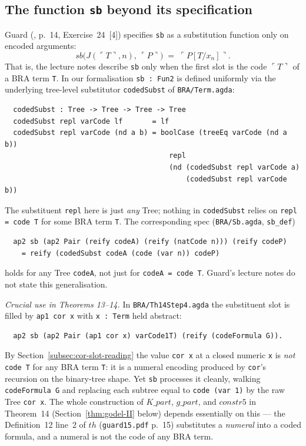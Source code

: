\documentclass[11pt]{article}
\begin{document}
\subsection{The function \texttt{sb} beyond its specification}
\label{subsec:sb-nonstandard}

Guard (\cite{guard1963}, p.~14, Exercise~24~[4]) specifies
\verb|sb| as a substitution function only on encoded arguments:
\[
  \mathit{sb}\big(J(\ulcorner T\urcorner, n),\, \ulcorner P\urcorner\big)
    \;=\; \ulcorner P[T/x_n]\urcorner.
\]
That is, the lecture notes describe \verb|sb| only when the first slot
is the code $\ulcorner T\urcorner$ of a BRA term \verb|T|.  In our
formalisation \verb|sb : Fun2| is defined uniformly via the underlying
tree-level substitutor \verb|codedSubst| of \verb|BRA/Term.agda|:
\begin{verbatim}
  codedSubst : Tree -> Tree -> Tree -> Tree
  codedSubst repl varCode lf       = lf
  codedSubst repl varCode (nd a b) = boolCase (treeEq varCode (nd a b))
                                       repl
                                       (nd (codedSubst repl varCode a)
                                           (codedSubst repl varCode b))
\end{verbatim}
The substituent \verb|repl| here is just \emph{any} Tree; nothing in
\verb|codedSubst| relies on \verb|repl = code T| for some BRA term
\verb|T|.  The corresponding spec (\verb|BRA/Sb.agda|, \verb|sb_def|)
\begin{verbatim}
  ap2 sb (ap2 Pair (reify codeA) (reify (natCode n))) (reify codeP)
    = reify (codedSubst codeA (code (var n)) codeP)
\end{verbatim}
holds for any Tree \verb|codeA|, not just for \verb|codeA = code T|.
Guard's lecture notes do not state this generalisation.

\emph{Crucial use in Theorems 13--14.}  In \verb|BRA/Th14Step4.agda|
the substituent slot is filled by \verb|ap1 cor x| with
\verb|x : Term| held abstract:
\begin{verbatim}
  ap2 sb (ap2 Pair (ap1 cor x) varCode1T) (reify (codeFormula G)).
\end{verbatim}
By Section~\ref{subsec:cor-slot-reading} the value \verb|cor x| at a
closed numeric \verb|x| is \emph{not} \verb|code T| for any BRA term
\verb|T|: it is a numeral encoding produced by \verb|cor|'s recursion
on the binary-tree shape.  Yet \verb|sb| processes it cleanly,
walking \verb|codeFormula G| and replacing each subtree equal to
\verb|code (var 1)| by the raw Tree \verb|cor x|.  The whole
construction of $K\_\mathit{part}$, $g\_\mathit{part}$, and
$\mathit{constr5}$ in Theorem~14 (Section~\ref{thm:godel-II} below)
depends essentially on this --- the Definition~12 line~2 of $\mathit{th}$
(\verb|guard15.pdf| p.\ 15) substitutes a \emph{numeral} into a coded
formula, and a numeral is not the code of any BRA term.
\end{document}
